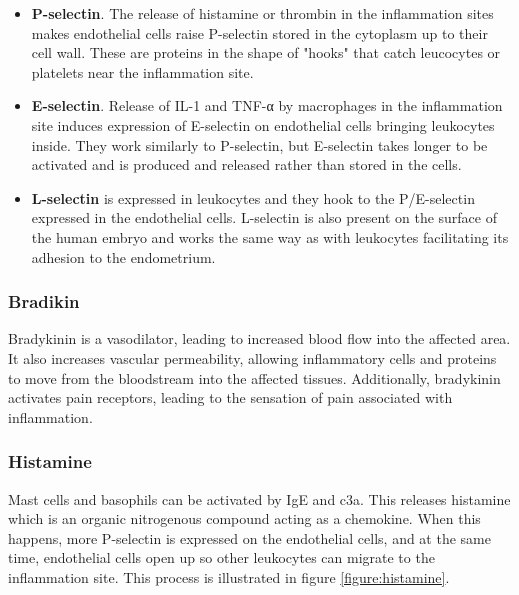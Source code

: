 \begin{itemize}

    \item {\textbf{P-selectin}}. The release of histamine or thrombin in the inflammation sites makes endothelial cells raise P-selectin stored in the cytoplasm up to their cell wall. These are proteins in the shape of "hooks" that catch leucocytes or platelets near the inflammation site.
 
    \item {\textbf{E-selectin}}. Release of IL-1 and TNF-α by macrophages in the inflammation site induces expression of E-selectin on endothelial cells bringing leukocytes inside. They work similarly to P-selectin, but E-selectin takes longer to be activated and is produced and released rather than stored in the cells.
    
    \item {\textbf{L-selectin}} is expressed in leukocytes and they hook to the P/E-selectin expressed in the endothelial cells. L-selectin is also present on the surface of the human embryo and works the same way as with leukocytes facilitating its adhesion to the endometrium.
    
\end{itemize}

\subsubsection{Bradikin}

Bradykinin is a vasodilator, leading to increased blood flow into the affected area. It also increases vascular permeability, allowing inflammatory cells and proteins to move from the bloodstream into the affected tissues. Additionally, bradykinin activates pain receptors, leading to the sensation of pain associated with inflammation.

\subsubsection{Histamine}
\label{in:histamine}

Mast cells and basophils can be activated by IgE and \gls{c3a}. This releases histamine which is an organic nitrogenous compound acting as a chemokine. When this happens, more P-selectin is expressed on the endothelial cells, and at the same time, endothelial cells open up so other leukocytes can migrate to the inflammation site. This process is illustrated in figure \ref{figure:histamine}.

